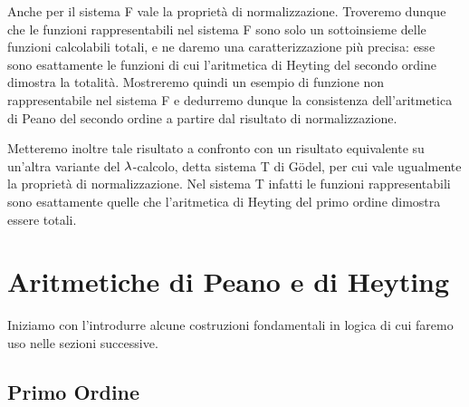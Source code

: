 \documentclass[]{marticle}
\begin{document}
Anche per il sistema F vale la propriet\`a di normalizzazione. Troveremo dunque
che le funzioni rappresentabili nel sistema F sono solo un sottoinsieme delle
funzioni calcolabili totali, e ne daremo una caratterizzazione pi\`u precisa:
esse sono esattamente le funzioni di cui l'aritmetica di Heyting del secondo
ordine dimostra la totalit\`a.  Mostreremo quindi un esempio di funzione non
rappresentabile nel sistema F e dedurremo dunque la consistenza dell'aritmetica
di Peano del secondo ordine a partire dal risultato di normalizzazione.

Metteremo inoltre tale risultato a confronto con un risultato equivalente su
un'altra variante del $\lambda$-calcolo, detta sistema T di G\"odel, per cui vale
ugualmente la propriet\`a di normalizzazione. Nel sistema T infatti le funzioni
rappresentabili sono esattamente quelle che l'aritmetica di Heyting del primo
ordine dimostra essere totali.

\section{Aritmetiche di Peano e di Heyting}
Iniziamo con l'introdurre alcune costruzioni fondamentali in logica di cui
faremo uso nelle sezioni successive.

\subsection{Primo Ordine}
\end{document}
